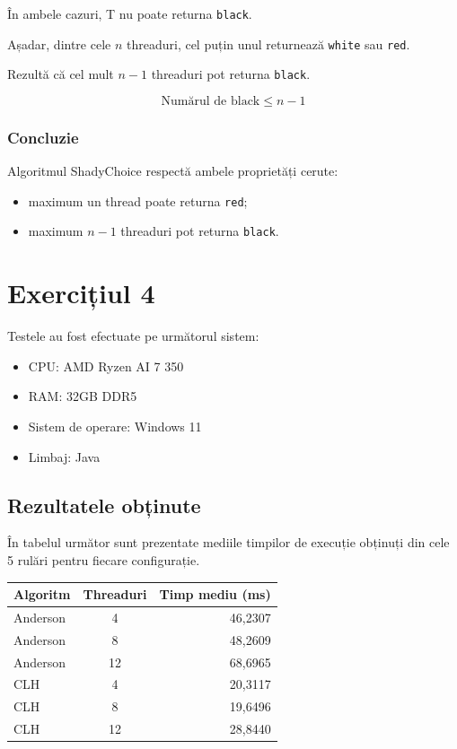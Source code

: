 \documentclass[12pt,a4paper]{article}
\begin{document}
În ambele cazuri, T nu poate
returna \texttt{black}.

Așadar, dintre cele $n$ threaduri,
cel puțin unul returnează
\texttt{white} sau \texttt{red}.

Rezultă că cel mult $n-1$
threaduri pot returna
\texttt{black}.

\[
\boxed{\text{Numărul de black} \leq n-1}
\]

\subsubsection*{Concluzie}

Algoritmul ShadyChoice respectă
ambele proprietăți cerute:

\begin{itemize}
    \item maximum un thread poate
    returna \texttt{red};
    \item maximum $n-1$ threaduri
    pot returna \texttt{black}.
\end{itemize}


\newpage
\section*{Exercițiul 4}

Testele au fost efectuate pe următorul sistem:

\begin{itemize}
    \item CPU: AMD Ryzen AI 7 350
    \item RAM: 32GB DDR5
    \item Sistem de operare: Windows 11
    \item Limbaj: Java
\end{itemize}

\subsection*{Rezultatele obținute}

În tabelul următor sunt prezentate
mediile timpilor de execuție obținuți
din cele 5 rulări pentru fiecare configurație.

\begin{center}
\begin{tabular}{|l|c|r|}
\hline
\textbf{Algoritm} &
\textbf{Threaduri} &
\textbf{Timp mediu (ms)} \\ \hline
Anderson & 4  & 46,2307 \\ \hline
Anderson & 8  & 48,2609 \\ \hline
Anderson & 12 & 68,6965 \\ \hline
CLH & 4  & 20,3117 \\ \hline
CLH & 8  & 19,6496 \\ \hline
CLH & 12 & 28,8440 \\ \hline
\end{tabular}
\end{center}
\end{document}
